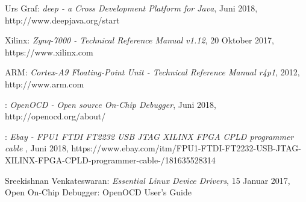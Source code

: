 \begingroup
\renewcommand{\chapter}[2]{\section#1{#2}}%
\begin{thebibliography}{99}


	Urs Graf:
	\emph{deep - a Cross Development Platform for Java},
	Juni 2018, http://www.deepjava.org/start


	Xilinx:
	\emph{Zynq-7000 - Technical Reference Manual v1.12},
	20 Oktober 2017, https://www.xilinx.com

	ARM:
	\emph{Cortex-A9 Floating-Point Unit - Technical Reference Manual r4p1},
	2012, http://www.arm.com

	:
	\emph{OpenOCD - Open source On-Chip Debugger},
	Juni 2018, http://openocd.org/about/

	:
	\emph{Ebay - FPU1 FTDI FT2232 USB JTAG XILINX FPGA CPLD programmer cable },
	Juni 2018, https://www.ebay.com/itm/FPU1-FTDI-FT2232-USB-JTAG-XILINX-FPGA-CPLD-programmer-cable-/181635528314
	
	Sreekishnan Venkateswaran:
	\emph{Essential Linux Device Drivers},
	15 Januar 2017, Open On-Chip Debugger: OpenOCD User's Guide









	\end{thebibliography}
\endgroup